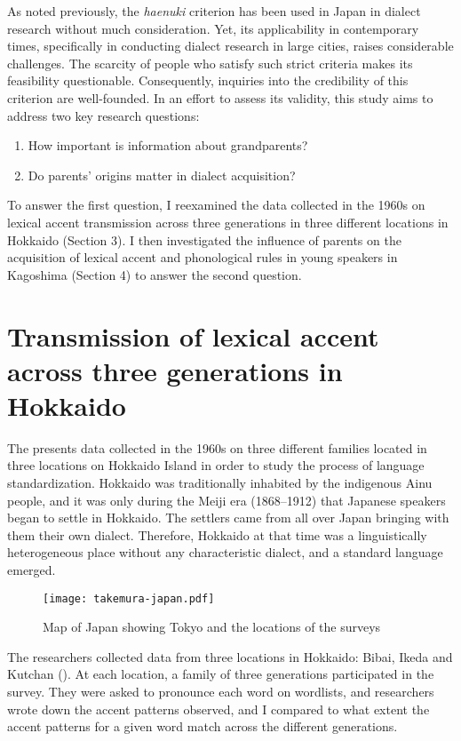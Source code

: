 \documentclass[output=paper,colorlinks,citecolor=brown]{langscibook}
\begin{document}
As noted previously, the \emph{haenuki} criterion has been used in Japan in dialect research without much consideration. Yet, its applicability in contemporary times, specifically in conducting dialect research in large cities, raises considerable challenges. The scarcity of people who satisfy such strict criteria makes its feasibility questionable. Consequently, inquiries into the credibility of this criterion are well-founded. In an effort to assess its validity, this study aims to address two key research questions:

\begin{enumerate}
    \item How important is information about grandparents? 
    \item Do parents’ origins matter in dialect acquisition? 
\end{enumerate}

To answer the first question, I reexamined the data collected in the 1960s \citep{NLRI1965} on lexical accent transmission across three generations in three different locations in Hokkaido (Section 3). I then investigated the influence of parents on the acquisition of lexical accent and phonological rules in young speakers in Kagoshima (Section 4) \citep{Takemura2012} to answer the second question.


\section{Transmission of lexical accent across three generations in Hokkaido}\label{sec:hokkaido}

The \citet{NLRI1965} presents data collected in the 1960s on three different families located in three locations on Hokkaido Island in order to study the process of language standardization. Hokkaido was traditionally inhabited by the indigenous Ainu people, and it was only during the Meiji era (1868--1912) that Japanese speakers began to settle in Hokkaido. The settlers came from all over Japan bringing with them their own dialect. Therefore, Hokkaido at that time was a linguistically heterogeneous place without any characteristic dialect, and a standard language emerged.

\begin{figure}
\texttt{[image: takemura-japan.pdf]}
\caption{Map of Japan showing Tokyo and the locations of the surveys}
\label{fig:japan}
\end{figure}

The \citet{NLRI1965} researchers collected data from three locations in Hokkaido: Bibai, Ikeda and Kutchan (). At each location, a family of three generations participated in the survey. They were asked to pronounce each word on wordlists, and researchers wrote down the accent patterns observed, and I compared to what extent the accent patterns for a given word match across the different generations.
\end{document}
